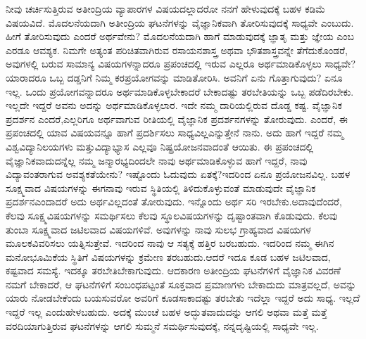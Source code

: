 ನೀವು ಚರ್ಚಿಸುತ್ತಿರುವ ಅತೀಂದ್ರಿಯ ವ್ಯಾಪಾರಗಳ ವಿಷಯದಲ್ಲಾದರೋ ನನಗೆ ಹೇಳುವುದಕ್ಕೆ ಬಹಳ ಕಡಿಮೆ ವಿಷಯವಿದೆ. ಮೊದಲನೆಯದಾಗಿ ಅತೀಂದ್ರಿಯ ಘಟನೆಗಳನ್ನು ವೈಜ್ಞಾನಿಕವಾಗಿ ತೋರಿಸುವುದಕ್ಕೆ ಸಾಧ್ಯವೇ ಎಂಬುದು. ಹೀಗೆ ತೋರಿಸುವುದು ಎಂದರೆ ಅರ್ಥವೇನು? ಮೊದಲನೆಯದಾಗಿ ಹಾಗೆ ಮಾಡುವುದಕ್ಕೆ ಜ್ಞಾತೃ ಮತ್ತು ಜ್ಞೇಯ ಎಂಬ ಎರಡೂ ಆವಶ್ಯಕ. ನಿಮಗೇ ಅತ್ಯಂತ ಪರಿಚಿತವಾಗಿರುವ ರಸಾಯನಶಾಸ್ತ್ರ ಅಥವಾ ಭೌತಶಾಸ್ತ್ರವನ್ನೇ ತೆಗೆದುಕೊಂಡರೆ, ಅವುಗಳಲ್ಲಿ ಬರುವ ಸಾಮಾನ್ಯ ವಿಷಯಗಳನ್ನಾದರೂ ಪ್ರಪಂಚದಲ್ಲಿ ಇರುವ ಎಲ್ಲರೂ ಅರ್ಥಮಾಡಿಕೊಳ್ಳಲು ಸಾಧ್ಯವೇ? ಯಾರಾದರೂ ಒಬ್ಬ ದಡ್ಡನಿಗೆ ನಿಮ್ಮ ಕರಪ್ರಯೋಗವನ್ನು ಮಾಡಿತೋರಿಸಿ. ಅವನಿಗೆ ಏನು ಗೊತ್ತಾಗುವುದು? ಏನೂ ಇಲ್ಲ. ಒಂದು ಪ್ರಯೋಗವನ್ನಾದರೂ ಅರ್ಥಮಾಡಿಕೊಳ್ಳಬೇಕಾದರೆ ಬೇಕಾದಷ್ಟು ತರಬೇತಿಯನ್ನು ಒಬ್ಬ ಪಡೆದಿರಬೇಕು. ಇಲ್ಲದೇ ಇದ್ದರೆ ಅವನು ಅದನ್ನು ಅರ್ಥಮಾಡಿಕೊಳ್ಳಲಾರ. ಇದೇ ನಮ್ಮ ದಾರಿಯಲ್ಲಿರುವ ದೊಡ್ಡ ಕಷ್ಟ. ವೈಜ್ಞಾನಿಕ ಪ್ರದರ್ಶನ ಎಂದರೆ,\break ಎಲ್ಲರಿಗೂ ಅರ್ಥವಾಗುವ ರೀತಿಯಲ್ಲಿ ವೈಜ್ಞಾನಿಕ ಪ್ರದರ್ಶನಗಳನ್ನು ತೋರುವುದು. ಎಂದರೆ, ಈ ಪ್ರಪಂಚದಲ್ಲಿ ಯಾವ ವಿಷಯವನ್ನೂ ಹಾಗೆ ಪ್ರದರ್ಶಿಸಲು ಸಾಧ್ಯವಿಲ್ಲ\break ಎನ್ನುತ್ತೇನೆ ನಾನು. ಅದು ಹಾಗೆ ಇದ್ದರೆ ನಮ್ಮ ವಿಶ್ವವಿದ್ಯಾನಿಲಯಗಳು ಮತ್ತು\break ವಿದ್ಯಾಭ್ಯಾಸ ಎಲ್ಲವೂ ನಿಷ್ಪ್ರಯೋಜನವಾದಂತೆ ಆಯಿತು. ಈ ಪ್ರಪಂಚದಲ್ಲಿ ವೈಜ್ಞಾನಿಕವಾದುದನ್ನೆಲ್ಲ ನಮ್ಮ ಜನ್ಮಾರಭ್ಯದಿಂದಲೇ ನಾವು ಅರ್ಥಮಾಡಿಕೊಳ್ಳುವ ಹಾಗೆ ಇದ್ದರೆ, ನಾವು ವಿದ್ಯಾವಂತರಾಗುವ ಅವಶ್ಯಕತೆಯೇನು? ಇಷ್ಟೊಂದು ಓದುವುದು ಏತಕ್ಕೆ?\break ಇದರಿಂದ ಏನೂ ಪ್ರಯೋಜನವಿಲ್ಲ. ಬಹಳ ಸೂಕ್ಷ್ಮವಾದ ವಿಷಯಗಳನ್ನು ಈಗ\break ನಾವು ಇರುವ ಸ್ಥಿತಿಯಲ್ಲಿ ತಿಳಿದುಕೊಳ್ಳುವಂತೆ ಮಾಡುವುದೇ ವೈಜ್ಞಾನಿಕ ಪ್ರದರ್ಶನ\break ಎಂದಾದರೆ ಅದು ಅರ್ಥವಿಲ್ಲದಂತೆ ತೋರುವುದು. ಇನ್ನೊಂದು ಅರ್ಥ ಸರಿ ಇರಬೇಕು.\break ಅದಾವುದೆಂದರೆ, ಕೆಲವು ಸೂಕ್ಷ್ಮವಿಷಯಗಳನ್ನು ಸಮರ್ಥಿಸಲು ಕೆಲವು ಸ್ಥೂಲ\break ವಿಷಯಗಳನ್ನು ದೃಷ್ಟಾಂತವಾಗಿ ಕೊಡುವುದು. ಕೆಲವು ತುಂಬಾ ಸೂಕ್ಷ್ಮವಾದ ಜಟಿಲವಾದ ವಿಷಯಗಳಿವೆ. ಅವುಗಳನ್ನು ನಾವು ಸುಲಭ ಗ್ರಾಹ್ಯವಾದ ವಿಷಯಗಳ ಮೂಲಕ\break ವಿವರಿಸಲು ಯತ್ನಿಸುತ್ತೇವೆ. ಇದರಿಂದ ನಾವು ಆ ಸತ್ಯಕ್ಕೆ ಹತ್ತಿರ ಬರಬಹುದು. ಇದರಿಂದ ನಮ್ಮ ಈಗಿನ ಮನೋಭೂಮಿಕೆಯ ಸ್ಥಿತಿಗೆ ವಿಷಯಗಳನ್ನು ಕ್ರಮೇಣ ತರಬಹುದು.\break ಆದರೆ ಇದೂ ಕೂಡ ಬಹಳ ಜಟಿಲವಾದ, ಕಷ್ಟವಾದ ಸಮಸ್ಯೆ. ಇದಕ್ಕೂ ತರಬೇತಿ\break ಬೇಕಾಗುವುದು. ಆದಕಾರಣ ಅತೀಂದ್ರಿಯ ಘಟನೆಗಳಿಗೆ ವೈಜ್ಞಾನಿಕ ವಿವರಣೆ ನಮಗೆ ಬೇಕಾದರೆ, ಆ ಘಟನೆಗಳಿಗೆ ಸಂಬಂಧಪಟ್ಟಂತೆ ಸೂಕ್ತವಾದ ಪ್ರಮಾಣಗಳು ಬೇಕಾದುದು ಮಾತ್ರವಲ್ಲದೆ, ಅವನ್ನು ಯಾರು ನೋಡಬೇಕೆಂದು ಬಯಸುವರೋ ಅವರಿಗೆ ಕೂಡ\break ಸಾಕಾದಷ್ಟು ತರಬೇತು ಇದೆಲ್ಲಾ ಇದ್ದರೆ ಅದು ಸಾಧ್ಯ. ಇಲ್ಲದೆ ಇದ್ದರೆ ಇಲ್ಲ ಎಂದು\break ಹೇಳಬಹುದು. ಅದಕ್ಕೆ ಮುಂಚೆ ಬಹಳ ಅದ್ಭುತವಾದುದನ್ನು ಆಗಲಿ ಅಥವಾ ಮತ್ತೆ ಮತ್ತೆ ವರದಿಯಾಗುತ್ತಿರುವ ಘಟನೆಗಳನ್ನು ಆಗಲಿ ಸುಮ್ಮನೆ ಸಮರ್ಥಿಸುವುದಕ್ಕೆ, ನನ್ನ\break ದೃಷ್ಟಿಯಲ್ಲಿ ಸಾಧ್ಯವೇ ಇಲ್ಲ.


